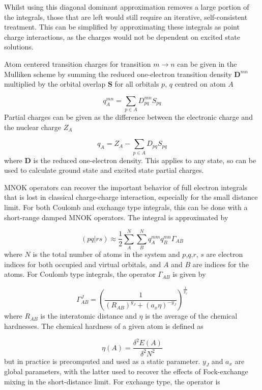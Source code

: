 Whilst using this diagonal dominant approximation removes a large portion of the
integrals, those that are left would still require an iterative, self-consistent
treatment. This can be simplified by approximating these integrals as point charge 
interactions, as the charges would not be dependent on excited state solutions.

Atom centered transition charges for transition $m \rightarrow n$ can be given in
the Mulliken scheme by summing the reduced one-electron transition density $\mathbf{D}^{mn}$
multiplied by the orbital overlap $\mathbf{S}$ for all orbitals $p$, $q$ centred
on atom $A$

\begin{equation}
q^{mn}_A = \sum_{p \in A} D^{mn}_{pq} S_{pq}  
\end{equation}
%
Partial charges can be given as the difference between the electronic charge
and the nuclear charge $Z_A$

\begin{equation}
q_A = Z_A - \sum_{p \in A} D_{pq} S_{pq}  
\end{equation}
%
where $\mathbf{D}$ is the reduced one-electron density. This applies to any state,
so can be used to calculate ground state and excited state partial charges.

MNOK operators can recover the important behavior of full electron integrals that
is lost in classical charge-charge interaction, especially for the small distance limit.
For both Coulomb and exchange type integrals, this can be done with a short-range
damped MNOK operators. The integral is approximated by

\begin{equation}
\left(pq|rs\right) \approx \frac{1}{2}\sum^N_A \sum^N_B q_A^{mm} q_B^{mn} \Gamma_{AB}
\end{equation}
%
where $N$ is the total number of atoms in the system and $p$,$q$,$r$, $s$ are electron
indices for both occupied and virtual orbitals, and $A$ and $B$ are indices for
 the atoms. For Coulomb type integrals, the operator $\Gamma_{AB}$ is given by

\begin{equation}
\Gamma^J_{AB} = \left(\frac{1}{\left(R_{AB}\right)^{y_J} + \left(a_x \eta\right)^{-y_J}} \right)^{\frac{1}{y_J}}
\end{equation}
%
where $R_{AB}$ is the interatomic distance and $\eta$ is the average of the chemical 
hardnesses. The chemical hardness of a given atom is defined as

\begin{equation}
\eta\left(A\right) = \frac{\delta^2 E\left(A\right)}{\delta^2 N^2}
\end{equation}
%
but in practice is precomputed and used as a static parameter. $y_J$ and $a_x$ are
global parameters, with the latter used to recover the effects of Fock-exchange
mixing in the short-distance limit. For exchange type, the operator is

